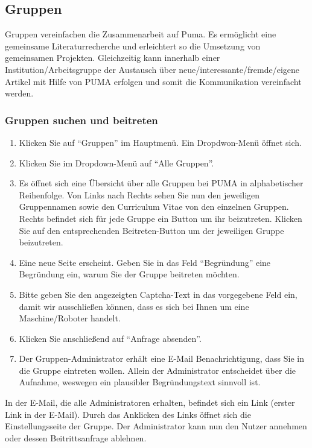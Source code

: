 \subsection{Gruppen}
Gruppen vereinfachen die Zusammenarbeit auf Puma. Es ermöglicht eine gemeinsame Literaturrecherche und erleichtert so die Umsetzung von gemeinsamen Projekten. Gleichzeitig kann innerhalb einer Institution/Arbeitsgruppe der Austausch über neue/interessante/fremde/eigene Artikel mit Hilfe von PUMA erfolgen und somit die Kommunikation vereinfacht werden. 
\subsubsection{Gruppen suchen und beitreten}
\begin{enumerate}
    \item Klicken Sie auf \enquote{Gruppen} im Hauptmenü. Ein Dropdwon-Menü öffnet sich.
    \item Klicken Sie im Dropdown-Menü auf \enquote{Alle Gruppen}.
    \item Es öffnet sich eine Übersicht über alle Gruppen bei PUMA in alphabetischer Reihenfolge. Von Links nach Rechts sehen Sie nun den jeweiligen Gruppennamen sowie den Curriculum Vitae von den einzelnen Gruppen. Rechts befindet sich für jede Gruppe ein Button um ihr beizutreten. Klicken Sie auf den entsprechenden Beitreten-Button um der jeweiligen Gruppe beizutreten.
    \item Eine neue Seite erscheint. Geben Sie in das Feld \enquote{Begründung} eine Begründung ein, warum Sie der Gruppe beitreten möchten.
    \item Bitte geben Sie den angezeigten Captcha-Text in das vorgegebene Feld ein, damit wir ausschließen können, dass es sich bei Ihnen um eine Maschine/Roboter handelt.
    \item Klicken Sie anschließend auf \enquote{Anfrage absenden}.
    \item Der Gruppen-Administrator erhält eine E-Mail Benachrichtigung, dass Sie in die Gruppe eintreten wollen. Allein der Administrator entscheidet über die Aufnahme, weswegen ein plausibler Begründungstext sinnvoll ist.
\end{enumerate}
In der E-Mail, die alle Administratoren erhalten, befindet sich ein Link (erster Link in der E-Mail). Durch das Anklicken des Links öffnet sich die Einstellungsseite der Gruppe. Der Administrator kann nun den Nutzer annehmen oder dessen Beitrittsanfrage ablehnen.

